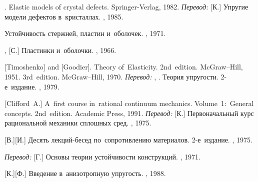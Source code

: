 \begin{thebibliography}{123}
\begin{otherlanguage}{russian}
.
Elastic models of crystal defects.
Springer\hbox{-}Verlag,
1982.
\emph{Перевод:}
[К.]
Упругие модели дефектов в~кристаллах.
\mirpublisher,
1985.

Устойчивость стержней, пластин и~оболочек.
\naukapublisher, 1971.

,
[С.]
Пластинки и~оболочки.
\naukapublisher, 1966.

[Timoshenko] and [Goodier].
Theory of~Elasticity.
2nd~edition. McGraw\hbox{--}Hill, 1951. 
3rd~edition. McGraw\hbox{--}Hill, 1970. 
\emph{Перевод:}
, .
Теория упругости.
2\hbox{-}е~издание.
\naukapublisher, 1979.

[Clifford~A.]
A~first course in~rational continuum mechanics.
Volume~1:~General concepts.
2nd~edition.
Academic Press,
1991.
%
\emph{Перевод:}
[К.]
Первоначальный курс рациональной механики сплошных сред.
\mirpublisher,
1975.

[В.][И.]
Десять лекций\hbox{-}бесед по~сопротивлению материалов.
2\hbox{-}е~издание.
\naukapublisher, 1975.

\emph{Перевод:}
[Г.]
Основы теории устойчивости конструкций.
\mirpublisher, 1971.

[К.][Ф.]
Введение в~анизотропную упругость.
\naukapublisher,
1988.


\end{otherlanguage}
\end{thebibliography}
